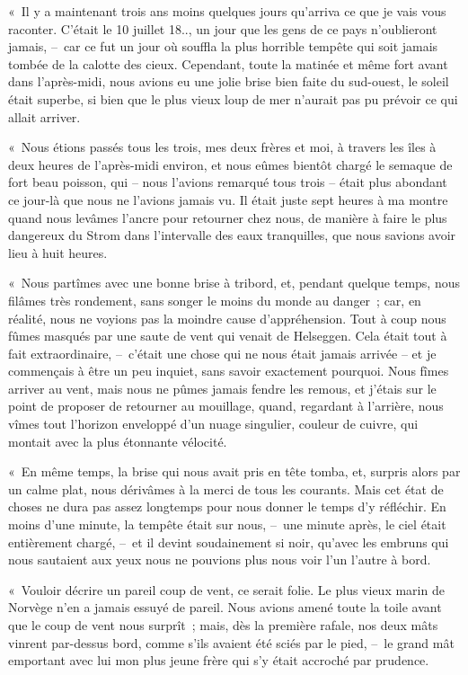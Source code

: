 \documentclass[french,twoside]{book} %
\begin{document}
« Il y a maintenant trois ans moins quelques jours qu’arriva ce que je vais vous raconter. C’était le 10 juillet 18.., un jour que les gens de ce pays n’oublieront jamais, – car ce fut un jour où souffla la plus horrible tempête qui soit jamais tombée de la calotte des cieux. Cependant, toute la matinée et même fort avant dans l’après-midi, nous avions eu une jolie brise bien faite du sud-ouest, le soleil était superbe, si bien que le plus vieux loup de mer n’aurait pas pu prévoir ce qui allait arriver.\par
« Nous étions passés tous les trois, mes deux frères et moi, à travers les îles à deux heures de l’après-midi environ, et nous eûmes bientôt chargé le semaque de fort beau poisson, qui – nous l’avions remarqué tous trois – était plus abondant ce jour-là que nous ne l’avions jamais vu. Il était juste sept heures à ma montre quand nous levâmes l’ancre pour retourner chez nous, de manière à faire le plus dangereux du Strom dans l’intervalle des eaux tranquilles, que nous savions avoir lieu à huit heures.\par
« Nous partîmes avec une bonne brise à tribord, et, pendant quelque temps, nous filâmes très rondement, sans songer le moins du monde au danger ; car, en réalité, nous ne voyions pas la moindre cause d’appréhension. Tout à coup nous fûmes masqués par une saute de vent qui venait de Helseggen. Cela était tout à fait extraordinaire, – c’était une chose qui ne nous était jamais arrivée – et je commençais à être un peu inquiet, sans savoir exactement pourquoi. Nous fîmes arriver au vent, mais nous ne pûmes jamais fendre les remous, et j’étais sur le point de proposer de retourner au mouillage, quand, regardant à l’arrière, nous vîmes tout l’horizon enveloppé d’un nuage singulier, couleur de cuivre, qui montait avec la plus étonnante vélocité.\par
« En même temps, la brise qui nous avait pris en tête tomba, et, surpris alors par un calme plat, nous dérivâmes à la merci de tous les courants. Mais cet état de choses ne dura pas assez longtemps pour nous donner le temps d’y réfléchir. En moins d’une minute, la tempête était sur nous, – une minute après, le ciel était entièrement chargé, – et il devint soudainement si noir, qu’avec les embruns qui nous sautaient aux yeux nous ne pouvions plus nous voir l’un l’autre à bord.\par
« Vouloir décrire un pareil coup de vent, ce serait folie. Le plus vieux marin de Norvège n’en a jamais essuyé de pareil. Nous avions amené toute la toile avant que le coup de vent nous surprît ; mais, dès la première rafale, nos deux mâts vinrent par-dessus bord, comme s’ils avaient été sciés par le pied, – le grand mât emportant avec lui mon plus jeune frère qui s’y était accroché par prudence.\par
\end{document}
